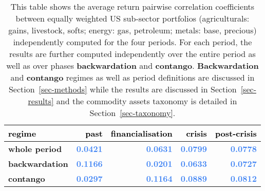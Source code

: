 \documentclass[
  authoryear,
  preprint,
  3p]{elsarticle}
\begin{document}
\begin{longtable}[t]{>{}l>{}r>{}r>{}r>{}r}

\caption{\label{tbl-correlations-cross-periods}This table shows the
average return pairwise correlation coefficients between equally
weighted US sub-sector portfolios (agriculturals: gains, livestock,
softs; energy: gas, petroleum; metals: base, precious) independently
computed for the four periods. For each period, the results are further
computed independently over the entire period as well as over phases
\textbf{backwardation} and \textbf{contango}. \textbf{Backwardation} and
\textbf{contango} regimes as well as period definitions are discussed in
Section~\ref{sec-methods} while the results are discussed in
Section~\ref{sec-results} and the commodity assets taxonomy is detailed
in Section~\ref{sec-taxonomy}.}

\tabularnewline

\toprule
\textcolor{black}{\textbf{regime}} & \textcolor{black}{\textbf{past}} & \textcolor{black}{\textbf{financialisation}} & \textcolor{black}{\textbf{crisis}} & \textcolor{black}{\textbf{post-crisis}}\\
\midrule
\textbf{whole period} & \textcolor[HTML]{4285f4}{\textbf{0.0421}} & \textcolor[HTML]{4285f4}{\textbf{0.0631}} & \textcolor[HTML]{4285f4}{\textbf{0.0799}} & \textcolor[HTML]{4285f4}{\textbf{0.0778}}\\
\textbf{backwardation} & \textcolor[HTML]{4285f4}{\textbf{0.1166}} & \textcolor[HTML]{4285f4}{\textbf{0.0201}} & \textcolor[HTML]{4285f4}{\textbf{0.0633}} & \textcolor[HTML]{4285f4}{\textbf{0.0727}}\\
\textbf{contango} & \textcolor[HTML]{4285f4}{\textbf{0.0297}} & \textcolor[HTML]{4285f4}{\textbf{0.1164}} & \textcolor[HTML]{4285f4}{\textbf{0.0889}} & \textcolor[HTML]{4285f4}{\textbf{0.0812}}\\
\bottomrule

\end{longtable}

\endgroup{}

\newpage
\end{document}
